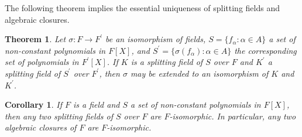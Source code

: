 \documentclass[12pt]{article}
\theoremstyle{plain}
\newtheorem*{thm*}{Theorem}
\newtheorem*{cor*}{Corollary}
\newcommand{\set}[1]{\{#1\}}
\begin{document}
The following theorem implies the essential uniqueness of splitting fields and algebraic closures. 
\begin{thm*}
Let $\sigma:F\rightarrow F^\prime$ be an isomorphism of fields, $S=\set{f_\alpha:\alpha\in A}$ a set of non-constant polynomials in $F[X]$, and $S^\prime=\set{\sigma(f_\alpha):\alpha\in A}$ the corresponding set of polynomials in $F^\prime[X]$. If $K$ is a splitting field of $S$ over $F$ and $K^\prime$ a splitting field of $S^\prime$ over $F^\prime$, then $\sigma$ may be extended to an isomorphism of $K$ and $K^\prime$.
\end{thm*}
\begin{cor*}
If $F$ is a field and $S$ a set of non-constant polynomials in $F[X]$, then any two splitting fields of $S$ over $F$ are $F$-isomorphic. In particular, any two algebraic closures of $F$ are $F$-isomorphic.
\end{cor*}
\end{document}
